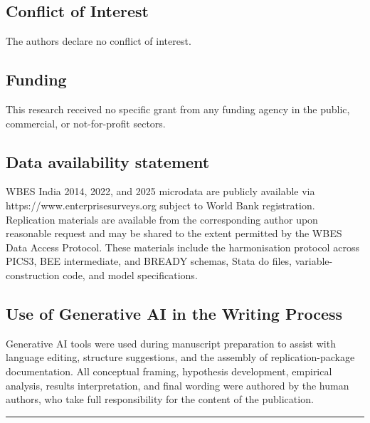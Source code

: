\documentclass[
  12pt,a4paper]{article}
\begin{document}
\hypertarget{conflict-of-interest}{%
\subsection{Conflict of Interest}\label{conflict-of-interest}}

The authors declare no conflict of interest.

\hypertarget{funding}{%
\subsection{Funding}\label{funding}}

This research received no specific grant from any funding agency in the
public, commercial, or not-for-profit sectors.

\hypertarget{data-availability-statement}{%
\subsection{Data availability
statement}\label{data-availability-statement}}

WBES India 2014, 2022, and 2025 microdata are publicly available via
https://www.enterprisesurveys.org subject to World Bank registration.
Replication materials are available from the corresponding author upon
reasonable request and may be shared to the extent permitted by the WBES
Data Access Protocol. These materials include the harmonisation protocol
across PICS3, BEE intermediate, and BREADY schemas, Stata do files,
variable-construction code, and model specifications.

\hypertarget{use-of-generative-ai-in-the-writing-process}{%
\subsection{Use of Generative AI in the Writing
Process}\label{use-of-generative-ai-in-the-writing-process}}

Generative AI tools were used during manuscript preparation to assist
with language editing, structure suggestions, and the assembly of
replication-package documentation. All conceptual framing, hypothesis
development, empirical analysis, results interpretation, and final
wording were authored by the human authors, who take full responsibility
for the content of the publication.

\begin{center}\rule{0.5\linewidth}{0.5pt}\end{center}
\end{document}

